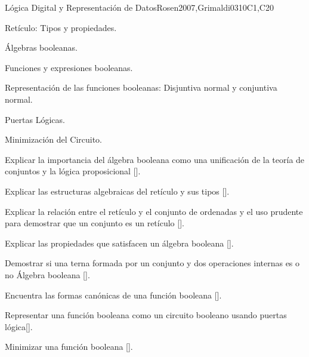 \begin{syllabus}
\begin{unit}{Lógica Digital y Representación de Datos}{}{Rosen2007,Grimaldi03}{10}{C1,C20}
    \begin{topics}
         \item Retículo: Tipos y propiedades.
         \item Álgebras booleanas.
         \item Funciones y expresiones booleanas.
         \item Representación de las funciones booleanas: Disjuntiva normal y conjuntiva normal.
         \item Puertas Lógicas.
         \item Minimización del Circuito.
    \end{topics}
     \begin{learningoutcomes}
         \item Explicar la importancia del álgebra booleana como una unificación de la teoría de conjuntos y la lógica proposicional [\Assessment].
         \item Explicar las estructuras algebraicas del retículo y sus tipos [\Assessment].
         \item Explicar la relación entre el retículo y el conjunto de ordenadas y el uso prudente para demostrar que un conjunto es un retículo [\Assessment].
         \item Explicar las propiedades que satisfacen un álgebra booleana [\Assessment].
         \item Demostrar si una terna formada por un conjunto y dos operaciones internas es o no Álgebra booleana [\Assessment].
         \item Encuentra las formas canónicas de una función booleana  [\Assessment].
         \item Representar una función booleana como un circuito booleano usando puertas lógica[\Assessment].
         \item Minimizar una función booleana [\Assessment].
     \end{learningoutcomes}
 \end{unit}


\end{syllabus}
